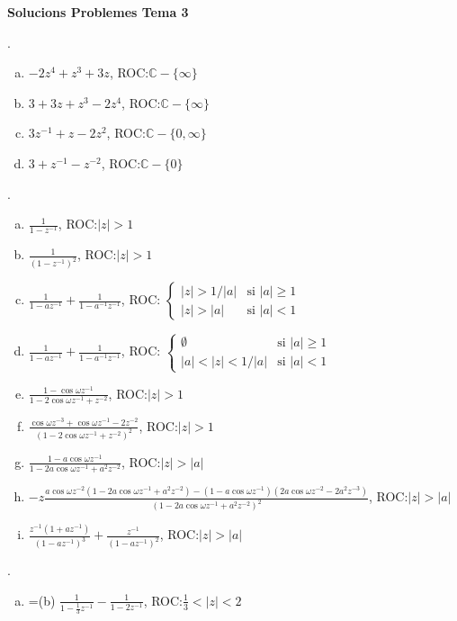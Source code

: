 \documentclass{article}
\newcommand\C{\mathbb{C}}
\begin{document}
\textbf{\Large Solucions Problemes Tema 3}

\vskip 1cm

.
\begin{enumerate}[(a)]
\item $-2z^4+z^3+3z$, ROC:$\C-\{\infty\}$
\item $3+3z+z^3-2z^4$, ROC:$\C-\{\infty\}$
\item $3z^{-1}+z-2z^2$, ROC:$\C-\{0, \infty\}$
\item $3+z^{-1}-z^{-2}$, ROC:$\C-\{0\}$
\end{enumerate}

.
\begin{enumerate}[(a)]
\item $\displaystyle \frac{1}{1-z^{-1}}$, ROC:$|z|>1$
\item $\displaystyle \frac{1}{(1-z^{-1})^2}$, ROC:$|z|>1$
\item $\displaystyle \frac{1}{1-az^{-1}}+\frac{1}{1-a^{-1}z^{-1}}$, 
ROC: $\begin{cases} |z|>1/|a| & \text{si } |a|\geq 1 \\ |z|>|a| & \text{si } |a|<1 \end{cases}$
\item $\displaystyle \frac{1}{1-az^{-1}}+\frac{1}{1-a^{-1}{z^{-1}}}$, 
ROC: $\begin{cases} \emptyset & \text{si } |a|\geq 1 \\ |a|<|z|<1/|a| & \text{si } |a|<1 \end{cases}$
\item $\displaystyle \frac{1-\cos\omega z^{-1}}{1-2\cos\omega z^{-1}+z^{-2}}$, ROC:$|z|>1$
\item $\displaystyle \frac{\cos\omega z^{-3}+\cos\omega z^{-1}-2z^{-2}}{(1-2\cos\omega z^{-1}+z^{-2})^2}$,
ROC:$|z|>1$
\item $\displaystyle \frac{1-a\cos\omega z^{-1}}{1-2a\cos\omega z^{-1}+a^2z^{-2}}$, ROC:$|z|>|a|$
\item $\displaystyle -z \frac{a\cos\omega z^{-2}(1-2a\cos\omega z^{-1}+a^2 z^{-2})-(1-a\cos\omega z^{-1})
(2a\cos\omega z^{-2}-2a^2 z^{-3})}{(1-2a\cos\omega z^{-1}+a^2 z^{-2})^2}$, ROC:$|z|>|a|$
\item $\displaystyle \frac{z^{-1}(1+az^{-1})}{(1-az^{-1})^3}+\frac{z^{-1}}{(1-az^{-1})^2}$, ROC:$|z|>|a|$
\end{enumerate}

.
\begin{enumerate}[(a)]
\item =(b) $\displaystyle \frac{1}{1-\frac{1}{3}z^{-1}} - \frac{1}{1-2z^{-1}}$, ROC:$\frac{1}{3}<|z|<2$
\end{enumerate}
\end{document}
